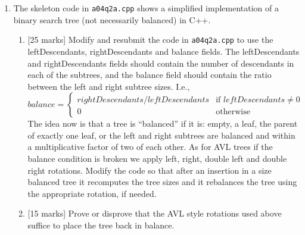 \documentclass[11pt]{article}
\begin{document}
\begin{enumerate}
\item The skeleton code in {\tt a04q2a.cpp} shows a simplified implementation of a binary search tree (not necessarily balanced) in C++. 
\begin{enumerate}
\item {[25 marks]}  
Modify and resubmit the code in {\tt a04q2a.cpp} to use the leftDescendants, rightDescendants and balance fields.
The leftDescendants and rightDescendants fields should contain the number of descendants in each of the subtrees, and the balance field should contain the ratio between the left and right subtree sizes.
I.e., 
$$
balance=
\begin{cases}
rightDescendants/leftDescendants & \mbox{if } leftDescendants \neq 0 \\
0 & \mbox{otherwise}
\end{cases}
$$
The idea now is that a tree is ``balanced'' if it is: empty, a leaf, the parent of exactly one leaf, or the left and right subtrees are balanced and within a multiplicative factor of two of each other. 
As for AVL trees if the balance condition is broken we apply left, right, double left and double right rotations. 
Modify the code so that after an insertion in a size balanced tree it recomputes the tree sizes and it rebalances the tree using the appropriate rotation, if needed. 

\item {[15 marks]} 
Prove or disprove that the AVL style rotations used above suffice to place the tree back in balance.
\end{enumerate}
\end{enumerate}
\end{document}

